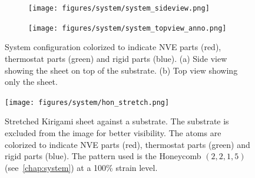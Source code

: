 \begin{figure}[H]
  \centering
  \begin{subfigure}[b]{0.65\textwidth}
      \centering
      \texttt{[image: figures/system/system\_sideview.png]}
      \caption{}
      \label{fig:sideview}
  \end{subfigure}
  \hfill
  \begin{subfigure}[b]{0.70\textwidth}
      \centering
      \texttt{[image: figures/system/system\_topview\_anno.png]}
      \caption{}
      \label{fig:topview}
  \end{subfigure}
  \hfill
     \caption{System configuration colorized to indicate NVE parts (red), thermostat parts (green) and rigid parts (blue). (a) Side view showing the sheet on top of the substrate. (b) Top view showing only the sheet.}
     \label{fig:system}
\end{figure}


\begin{figure}[H]
  \centering
  \texttt{[image: figures/system/hon\_stretch.png]}
  \caption{Stretched Kirigami sheet against a substrate. The substrate is excluded from the image for better visibility. The atoms are colorized to indicate NVE parts (red), thermostat parts (green) and rigid parts (blue). The pattern used is the Honeycomb $(2,2,1,5)$ (see~\cref{chap:system}) at a 100\% strain level.}
  \label{fig:kirigami_stretch}
\end{figure}



